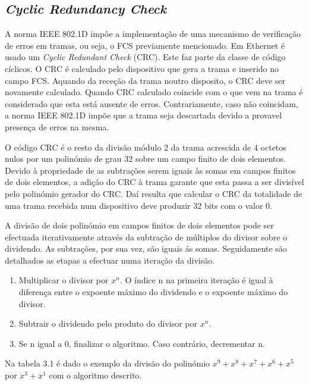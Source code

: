 \subsection{\textit{Cyclic Redundancy Check}}


A norma IEEE 802.1D impôe a implementação de uma mecanismo de verificação de erros em tramas, ou seja, o FCS previamente mencionado. Em Ethernet é usado um \textit{Cyclic Redundant Check} (CRC). Este faz parte da classe de código cíclicos. O CRC é calculado pelo dispositivo que gera a trama e inserido no campo FCS. Aquando da receção da trama noutro disposito, o CRC deve ser novamente calculado. Quando CRC calculado coincide com o que vem na trama é considerado que esta está ausente de erros. Contrariamente, caso não coincidam, a norma IEEE 802.1D impõe que a trama seja descartada devido a provavel presença de erros na mesma.\par
O código CRC é o resto da divisão módulo 2 da trama acrescida de 4 octetos nulos por um polinómio de grau 32 sobre um campo finito de dois elementos. Devido à propriedade de as subtrações serem iguais às somas em campos finitos de dois elementos, a adição do CRC à trama garante que esta passa a ser divisível pelo polinómio gerador do CRC. Daí resulta que calcular o CRC da totalidade de uma trama recebida num dispositivo deve produzir 32 bits com o valor 0.\par
A divisão de dois polinómio em campos finitos de dois elementos pode ser efectuada iterativamente através da subtração de múltiplos do divisor sobre o dividendo. As subtrações, por sua vez, são iguais ás somas. Seguidamente são detalhados as etapas a efectuar numa iteração da divisão. 

\begin{enumerate}
\item Multiplicar o divisor por \(x^{n}\). O índice n na primeira iteração é igual à diferença entre o expoente máximo do dividendo e o expoente máximo do divisor.
\item Subtrair o dividendo pelo produto do divisor por \(x^{n}\).
\item Se n igual a 0, finalizar o algoritmo. Caso contrário, decrementar n.
\end{enumerate}

Na tabela 3.1 é dado o exemplo da divisão do polinómio \(x^{9} + x^{8} + x^{7} + x^{6} + x^{5}\) por \(x^{3} + x^{1}\) com o algoritmo descrito.


